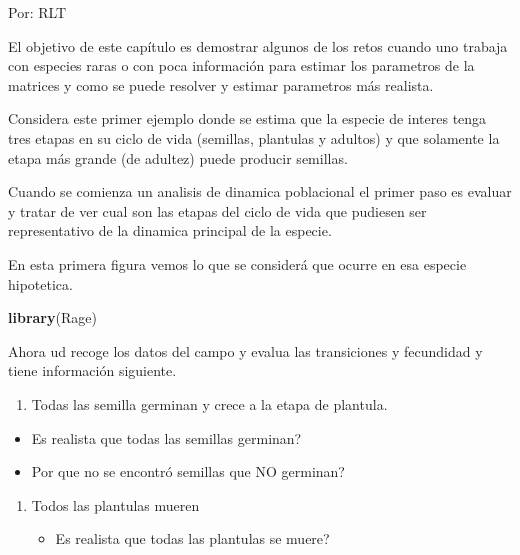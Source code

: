 \documentclass[
]{book}
\newenvironment{Shaded}{\begin{snugshade}}{\end{snugshade}}
\newcommand{\FunctionTok}[1]{\textcolor[rgb]{0.13,0.29,0.53}{\textbf{#1}}}
\newcommand{\NormalTok}[1]{#1}
\providecommand{\tightlist}{%
  \setlength{\itemsep}{0pt}\setlength{\parskip}{0pt}}
\theoremstyle{definition}
\theoremstyle{definition}
\theoremstyle{definition}
\theoremstyle{definition}
\theoremstyle{remark}
\begin{document}
Por: RLT

El objetivo de este capítulo es demostrar algunos de los retos cuando uno trabaja con especies raras o con poca información para estimar los parametros de la matrices y como se puede resolver y estimar parametros más realista.

Considera este primer ejemplo donde se estima que la especie de interes tenga tres etapas en su ciclo de vida (semillas, plantulas y adultos) y que solamente la etapa más grande (de adultez) puede producir semillas.

Cuando se comienza un analisis de dinamica poblacional el primer paso es evaluar y tratar de ver cual son las etapas del ciclo de vida que pudiesen ser representativo de la dinamica principal de la especie.

En esta primera figura vemos lo que se considerá que ocurre en esa especie hipotetica.

\begin{Shaded}
\begin{Highlighting}[]
\FunctionTok{library}\NormalTok{(Rage)}
\end{Highlighting}
\end{Shaded}

Ahora ud recoge los datos del campo y evalua las transiciones y fecundidad y tiene información siguiente.

\begin{enumerate}
\def\labelenumi{\arabic{enumi}.}
\tightlist
\item
  Todas las semilla germinan y crece a la etapa de plantula.\\
\end{enumerate}

\begin{itemize}
\tightlist
\item
  Es realista que todas las semillas germinan?
\item
  Por que no se encontró semillas que NO germinan?
\end{itemize}

\begin{enumerate}
\def\labelenumi{\arabic{enumi}.}
\setcounter{enumi}{1}
\tightlist
\item
  Todos las plantulas mueren

  \begin{itemize}
  \tightlist
  \item
    Es realista que todas las plantulas se muere?
  \end{itemize}
\end{enumerate}
\end{document}
